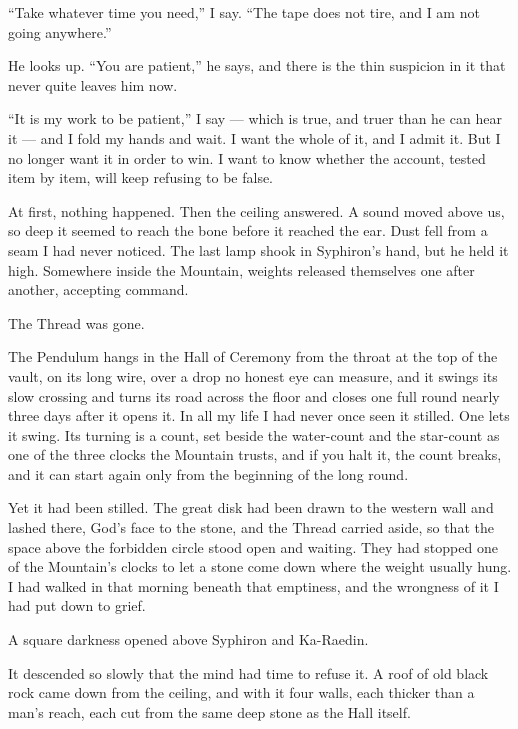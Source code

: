 ``Take whatever time you need,'' I say. ``The tape does not tire, and I am not going anywhere.''\par

He looks up. ``You are patient,'' he says, and there is the thin suspicion in it that never quite leaves him now.\par

``It is my work to be patient,'' I say --- which is true, and truer than he can hear it --- and I fold my hands and wait. I want the whole of it, and I admit it. But I no longer want it in order to win. I want to know whether the account, tested item by item, will keep refusing to be false.\par

\ornament

At first, nothing happened.
Then the ceiling answered.
A sound moved above us, so deep it seemed to reach the bone before it reached the ear.
Dust fell from a seam I had never noticed.
The last lamp shook in Syphiron's hand, but he held it high.
Somewhere inside the Mountain, weights released themselves one after another, accepting command.\par
The Thread was gone.\par
The Pendulum hangs in the Hall of Ceremony from the throat at the top of the vault, on its long wire, over a drop no honest eye can measure, and it swings its slow crossing and turns its road across the floor and closes one full round nearly three days after it opens it. In all my life I had never once seen it stilled. One lets it swing. Its turning is a count, set beside the water-count and the star-count as one of the three clocks the Mountain trusts, and if you halt it, the count breaks, and it can start again only from the beginning of the long round.\par
Yet it had been stilled. The great disk had been drawn to the western wall and lashed there, God's face to the stone, and the Thread carried aside, so that the space above the forbidden circle stood open and waiting. They had stopped one of the Mountain's clocks to let a stone come down where the weight usually hung. I had walked in that morning beneath that emptiness, and the wrongness of it I had put down to grief.\par
A square darkness opened above Syphiron and Ka-Raedin.\par
It descended so slowly that the mind had time to refuse it.
A roof of old black rock came down from the ceiling, and with it four walls, each thicker than a man's reach, each cut from the same deep stone as the Hall itself.
